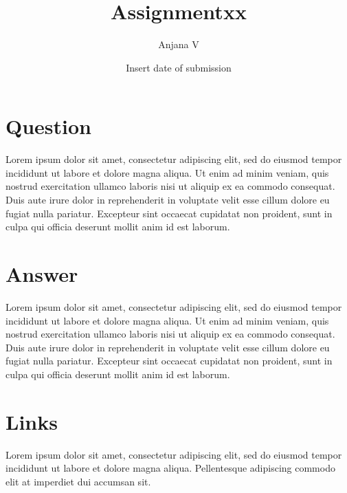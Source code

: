 \documentclass{article}
\title{Assignmentxx}
\author{Anjana V }
\date{Insert date of submission}
\begin{document}
\newcommand{\myvec}[1]{\ensuremath{\begin{pmatrix}#1\end{pmatrix}}}
\renewcommand{\vec}[1]{\mathbf{#1}}
\maketitle
\section*{Question}
Lorem ipsum dolor sit amet, consectetur adipiscing elit, sed do eiusmod tempor incididunt ut labore et dolore magna aliqua. Ut enim ad minim veniam, quis nostrud exercitation ullamco laboris nisi ut aliquip ex ea commodo consequat. Duis aute irure dolor in reprehenderit in voluptate velit esse cillum dolore eu fugiat nulla pariatur. Excepteur sint occaecat cupidatat non proident, sunt in culpa qui officia deserunt mollit anim id est laborum.
\section*{Answer}
Lorem ipsum dolor sit amet, consectetur adipiscing elit, sed do eiusmod tempor incididunt ut labore et dolore magna aliqua. Ut enim ad minim veniam, quis nostrud exercitation ullamco laboris nisi ut aliquip ex ea commodo consequat. Duis aute irure dolor in reprehenderit in voluptate velit esse cillum dolore eu fugiat nulla pariatur. Excepteur sint occaecat cupidatat non proident, sunt in culpa qui officia deserunt mollit anim id est laborum.
\section*{Links}
Lorem ipsum dolor sit amet, consectetur adipiscing elit, sed do eiusmod tempor incididunt ut labore et dolore magna aliqua. Pellentesque adipiscing commodo elit at imperdiet dui accumsan sit.
\end{document}
